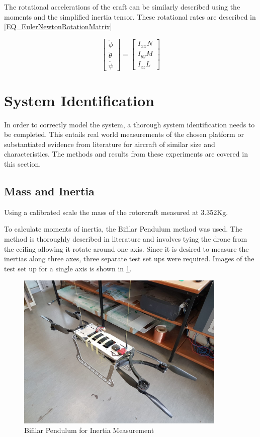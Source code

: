 The rotational accelerations of the craft can be similarly described using the moments and the simplified inertia tensor. These rotational rates are described in \eqref{EQ_EulerNewtonRotationMatrix}

\begin{equation}
\begin{bmatrix}\ddot{\phi}\\ \ddot{\theta} \\ \ddot{\psi} \end{bmatrix} = \begin{bmatrix} I_{xx} N  \\ I_{yy} M  \\ I_{zz} L \end{bmatrix}
\label{EQ_EulerNewtonRotationMatrix}
\end{equation}
	
\section{System Identification}
In order to correctly model the system, a thorough system identification needs to be completed. This entails real world measurements of the chosen platform or substantiated evidence from literature for aircraft of similar size and characteristics. The methods and results from these experiments are covered in this section.

	\subsection{Mass and Inertia}
	Using a calibrated scale the mass of the rotorcraft measured at 3.352Kg. 
	
	To calculate moments of inertia, the Bifilar Pendulum method was used. The method is thoroughly described in literature and involves tying the drone from the ceiling allowing it rotate around one axis. Since it is desired to measure the inertias along three axes, three separate test set ups were required. Images of the test set up for a single axis is shown in \ref{IM_BifilarPendulum}. 
	
	\begin{figure}[H]
		\centering
		\includegraphics[height = 7.5cm]{Images/BifilarPendulum.jpeg}
		\caption{Bifilar Pendulum for Inertia Measurement}
		\label{IM_BifilarPendulum}
	\end{figure}
	
